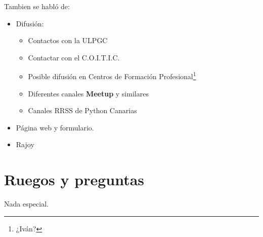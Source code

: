 \documentclass[a4paper, 12pt]{article}
\begin{document}
Tambien se habló de:
\begin{itemize}
	\item Difusión:
	\begin{itemize}
		\item Contactos con la ULPGC
		\item Contactar con el C.O.I.T.I.C.
		\item Posible difusión en Centros de Formación Profesional\footnote{¿Iván?}
		\item Diferentes canales \textbf{Meetup} y similares
		\item Canales RRSS de Python Canarias
	\end{itemize}
	\item Página web y formulario. 
	\item Rajoy
\end{itemize}



\section{Ruegos y preguntas}

Nada especial.


%
%
%
\end{document}
